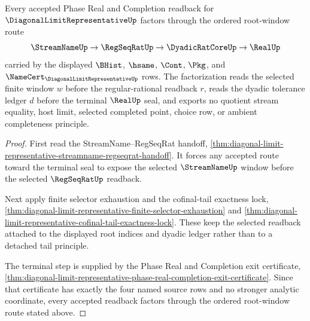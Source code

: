 \begin{theorem}
\label{thm:diagonal-limit-representative-phase-root-readback-factorization}
Every accepted Phase Real and Completion readback for $\DiagonalLimitRepresentativeUp$ factors through the ordered root-window route
$$
\StreamNameUp \to \RegSeqRatUp \to \DyadicRatCoreUp \to \RealUp
$$
carried by the displayed $\BHist$, $\hsame$, $\Cont$, $\Pkg$, and $\NameCert_{\DiagonalLimitRepresentativeUp}$ rows. The factorization reads the selected finite window $w$ before the regular-rational readback $r$, reads the dyadic tolerance ledger $d$ before the terminal $\RealUp$ seal, and exports no quotient stream equality, host limit, selected completed point, choice row, or ambient completeness principle.
\end{theorem}
\begin{proof}
First read the StreamName--RegSeqRat handoff, \autoref{thm:diagonal-limit-representative-streamname-regseqrat-handoff}. It forces any accepted route toward the terminal seal to expose the selected $\StreamNameUp$ window before the selected $\RegSeqRatUp$ readback.

Next apply finite selector exhaustion and the cofinal-tail exactness lock, \autoref{thm:diagonal-limit-representative-finite-selector-exhaustion} and \autoref{thm:diagonal-limit-representative-cofinal-tail-exactness-lock}. These keep the selected readback attached to the displayed root indices and dyadic ledger rather than to a detached tail principle.

The terminal step is supplied by the Phase Real and Completion exit certificate, \autoref{thm:diagonal-limit-representative-phase-real-completion-exit-certificate}. Since that certificate has exactly the four named source rows and no stronger analytic coordinate, every accepted readback factors through the ordered root-window route stated above.
\end{proof}

